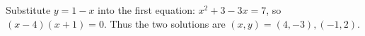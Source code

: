 Substitute $y=1-x$ into the first equation: $x^2+3-3x=7$, so $(x-4)(x+1)=0$. Thus the two solutions are $\boxed{(x,y)=(4,-3),(-1,2)}$.
